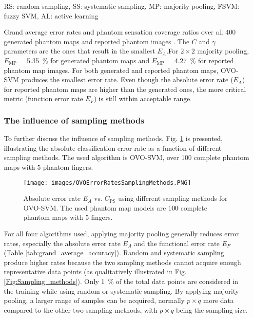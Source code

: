 \begin{table}[!h]
\begin{adjustbox}{angle=90}
\begin{threeparttable}
\begin{tablenotes}
      \small
      \item RS: random sampling, SS: systematic sampling, MP: majority pooling, FSVM: fuzzy SVM, AL: active learning
    \end{tablenotes}
  \end{threeparttable}          
\end{adjustbox} 
\caption{Grand average error rates and phantom sensation coverage ratios over all 400 generated phantom maps and reported phantom images \cite{antfolk2012sensory, bjorkman2016sensory, chai2015characterization}. The $C$ and $\gamma$ parameters are the ones that result in the smallest $E_A$.For $2 \times 2$ majority pooling,  $\overline{E_{\text{MP}}}$ = \SI{5.35}{\%} for generated phantom maps and $\overline{E_{\text{MP}}}$ = \SI{4.27}{\%} for reported phantom map images. For both generated and reported phantom maps, OVO-SVM produces the smallest error rate. Even though the absolute error rate ($E_A$) for reported phantom maps are higher than the generated ones, the more critical metric (function error rate $E_F$) is still within acceptable range.}
\label{tab:grand_average_accuracy}
\end{table}



\subsubsection{The influence of sampling methods}
To further discuss the influence of sampling methods, Fig. \ref{fig:accuracy_sampling} is presented, illustrating the absolute classification error rate as a function of different sampling methods. The used algorithm is OVO-SVM, over 100 complete phantom maps with 5 phantom fingers. 


\begin{figure}[htb]
    \centering
    \texttt{[image: images/OVOErrorRatesSamplingMethods.PNG]}
    \caption{Absolute error rate $E_A$ vs. $C_{\text{PS}}$ using different sampling methods for OVO-SVM. The used phantom map models are 100 complete phantom maps with 5 fingers.}
    \label{fig:accuracy_sampling}
\end{figure} 

For all four algorithms used, applying majority pooling generally reduces error rates, especially the absolute error rate $E_A$ and the functional error rate $E_F$ (Table \ref{tab:grand_average_accuracy}). Random and systematic sampling produce higher rates because the two  sampling methods cannot acquire enough representative data points (as qualitatively illustrated in Fig. \ref{Fig:Sampling_methods}). Only \SI{1}{\%} of the total data points are considered in the training while using random or systematic sampling.
By applying majority pooling, a larger range of samples can be acquired, normally $p \times q$ more data compared to the other two sampling methods, with $p \times q$ being the sampling size.


